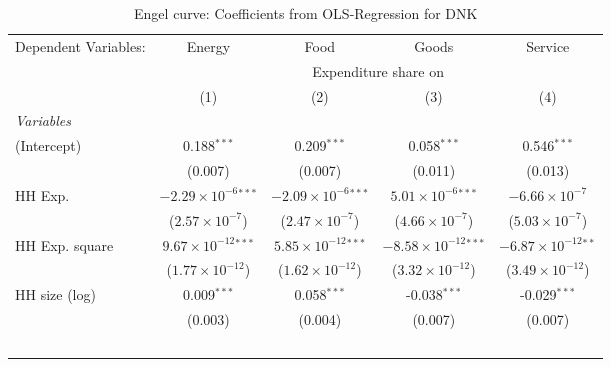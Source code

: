 
\begin{table}[htbp!]
   \centering
   \small
   \begin{adjustbox}{width = 1\textwidth, max height = 0.95\textheight, center}
      \begin{threeparttable}[b]
         \caption{\label{tab:Engel_parametric_DNK} Engel curve: Coefficients from OLS-Regression for DNK}
         \begin{tabular}{lcccc}
            \tabularnewline \midrule \midrule
            Dependent Variables: & Energy                         & Food                           & Goods                           & Service\\  
             & \multicolumn{4}{c}{Expenditure share on} \\ 
                                 & (1)                            & (2)                            & (3)                             & (4)\\  
            \midrule
            \emph{Variables}\\
            (Intercept)          & 0.188$^{***}$                  & 0.209$^{***}$                  & 0.058$^{***}$                   & 0.546$^{***}$\\   
                                 & (0.007)                        & (0.007)                        & (0.011)                         & (0.013)\\   
            HH Exp.              & $-2.29\times 10^{-6}$$^{***}$  & $-2.09\times 10^{-6}$$^{***}$  & $5.01\times 10^{-6}$$^{***}$    & $-6.66\times 10^{-7}$\\    
                                 & ($2.57\times 10^{-7}$)         & ($2.47\times 10^{-7}$)         & ($4.66\times 10^{-7}$)          & ($5.03\times 10^{-7}$)\\    
            HH Exp. square       & $9.67\times 10^{-12}$$^{***}$  & $5.85\times 10^{-12}$$^{***}$  & $-8.58\times 10^{-12}$$^{***}$  & $-6.87\times 10^{-12}$$^{**}$\\    
                                 & ($1.77\times 10^{-12}$)        & ($1.62\times 10^{-12}$)        & ($3.32\times 10^{-12}$)         & ($3.49\times 10^{-12}$)\\    
            HH size (log)        & 0.009$^{***}$                  & 0.058$^{***}$                  & -0.038$^{***}$                  & -0.029$^{***}$\\   
                                 & (0.003)                        & (0.004)                        & (0.007)                         & (0.007)\\   
$$
\end{tabular}
\end{threeparttable}
\end{adjustbox}
\end{table}
